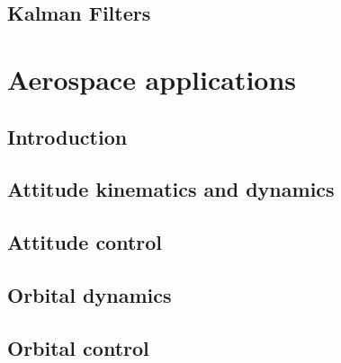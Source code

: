 \documentclass[a4paper, 12pt]{report}
\begin{document}
\chapter{Kalman Filters}



\part{Aerospace applications}
\chapter{Introduction}

\chapter{Attitude kinematics and dynamics}


\chapter{Attitude control}


\chapter{Orbital dynamics}


\chapter{Orbital control}
\end{document}
